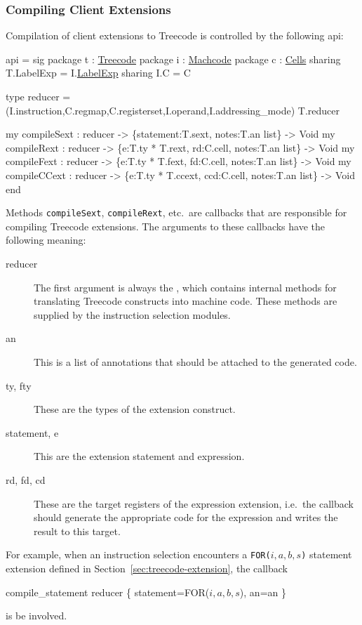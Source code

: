 \subsubsection{Compiling Client Extensions}

Compilation of client extensions to Treecode is controlled by the
following api: 
\begin{SML}
api  =
sig
   package t : \href{treecode.html}{Treecode}
   package i : \href{instructions.html}{Machcode}
   package c : \href{cells.html}{Cells}
      sharing T.LabelExp = I.\href{labelexp.html}{LabelExp}
      sharing I.C = C

   type reducer = 
     (I.instruction,C.regmap,C.registerset,I.operand,I.addressing_mode) T.reducer

   my compileSext : reducer -> \{statement:T.sext, notes:T.an list\} -> Void
   my compileRext : reducer -> \{e:T.ty * T.rext, rd:C.cell, notes:T.an list\} -> Void
   my compileFext : reducer -> \{e:T.ty * T.fext, fd:C.cell, notes:T.an list\} -> Void
   my compileCCext : reducer -> \{e:T.ty * T.ccext, ccd:C.cell, notes:T.an list\} -> Void
end
\end{SML}

Methods \verb|compileSext|, \verb|compileRext|, etc.~are callbacks that
are responsible for compiling Treecode extensions.  The arguments
to these callbacks have the following meaning:
\begin{description}
  \item[reducer] The first argument is always the , 
which contains internal methods for translating Treecode constructs
into machine code.  These methods are supplied by the instruction
selection modules.
  \item[an] This is a list of annotations that should be attached to the
generated code.
  \item[ty, fty] These are the types of the extension construct.
  \item[statement, e] This are the extension statement and expression.
  \item[rd, fd, cd] These are the target registers of the 
expression extension, i.e.~the callback should generate the appropriate
code for the expression and writes the result to this target.
\end{description}

For example, when an instruction selection encounters a
\verb|FOR(|$i,a,b,s$\verb|)| statement extension
defined in Section~\ref{sec:treecode-extension}, the callback
\begin{SML}   
  compile_statement reducer \{ statement=FOR(\(i,a,b,s\)), an=an \}
\end{SML}
\noindent is be involved. 

